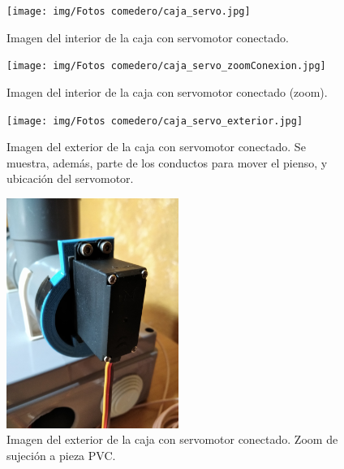 \documentclass[12pt]{article}
\begin{document}
	\pagebreak
	
	\begin{figure}[h]
		\begin{center}
			\texttt{[image: img/Fotos comedero/caja\_servo.jpg]}
			\caption{Imagen del interior de la caja con servomotor conectado.}
			\label{Prototipo: caja con servo}
		\end{center}
	\end{figure}

	\pagebreak

	\begin{figure}[h]
		\begin{center}
			\texttt{[image: img/Fotos comedero/caja\_servo\_zoomConexion.jpg]}
			\caption{Imagen del interior de la caja con servomotor conectado (zoom).}
			\label{Prototipo: caja con servo (zoom)}
		\end{center}
	\end{figure}
	
	\pagebreak

	\begin{figure}[h]
		\begin{center}
			\texttt{[image: img/Fotos comedero/caja\_servo\_exterior.jpg]}
			\caption{Imagen del exterior de la caja con servomotor conectado. Se muestra, además, parte de los conductos para mover el pienso, y ubicación del servomotor.}
			\label{Prototipo: caja con servo (exterior)}
		\end{center}
	\end{figure}

	\pagebreak

	\begin{figure}[h]
		\begin{center}
			\includegraphics[width=0.5\textwidth]{img/Fotos comedero/servo_sujecion_zoom.jpg}
			\caption{Imagen del exterior de la caja con servomotor conectado. Zoom de sujeción a pieza PVC.}
			\label{Prototipo: sujecion exterior servo (zoom)}
		\end{center}
	\end{figure}
\end{document}
